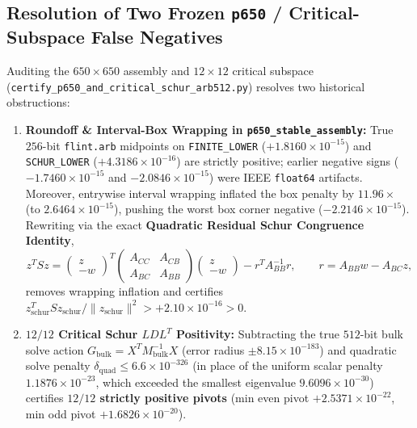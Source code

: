\documentclass[11pt,a4paper]{article}
\theoremstyle{definition}
\begin{document}
\subsection{Resolution of Two Frozen \texttt{p650} / Critical-Subspace False Negatives}
Auditing the $650 \times 650$ assembly and $12 \times 12$ critical subspace (\texttt{certify\_\allowbreak p650\_\allowbreak and\_\allowbreak critical\_\allowbreak schur\_\allowbreak arb512.py}) resolves two historical obstructions:
\begin{enumerate}[label=(\arabic*),noitemsep]
  \item \textbf{Roundoff \& Interval-Box Wrapping in \texttt{p650\_\allowbreak stable\_\allowbreak assembly}:} True $256$-bit \texttt{flint.arb} midpoints on \texttt{FINITE\_LOWER} ($+1.8160 \times 10^{-15}$) and \texttt{SCHUR\_LOWER} ($+4.3186 \times 10^{-16}$) are strictly positive; earlier negative signs ($-1.7460 \times 10^{-15}$ and $-2.0846 \times 10^{-15}$) were IEEE \texttt{float64} artifacts. Moreover, entrywise interval wrapping inflated the box penalty by $11.96\times$ (to $2.6464 \times 10^{-15}$), pushing the worst box corner negative ($-2.2146 \times 10^{-15}$). Rewriting via the exact \textbf{Quadratic Residual Schur Congruence Identity},
  \begin{equation}
  z^T S z = \begin{pmatrix} z \\ -w \end{pmatrix}^T \begin{pmatrix} A_{CC} & A_{CB} \\ A_{BC} & A_{BB} \end{pmatrix} \begin{pmatrix} z \\ -w \end{pmatrix} - r^T A_{BB}^{-1} r, \qquad r = A_{BB}w - A_{BC}z,
  \end{equation}
  removes wrapping inflation and certifies $z_{\mathrm{schur}}^T S z_{\mathrm{schur}}/\|z_{\mathrm{schur}}\|^2 > +2.10 \times 10^{-16} > 0$.
  \item \textbf{$12/12$ Critical Schur $LDL^T$ Positivity:} Subtracting the true $512$-bit bulk solve action $G_{\mathrm{bulk}} = X^T M_{\mathrm{bulk}}^{-1} X$ (error radius $\pm 8.15 \times 10^{-183}$) and quadratic solve penalty $\delta_{\mathrm{quad}} \le 6.6 \times 10^{-326}$ (in place of the uniform scalar penalty $1.1876 \times 10^{-23}$, which exceeded the smallest eigenvalue $9.6096 \times 10^{-30}$) certifies \textbf{$12/12$ strictly positive pivots} (min even pivot $+2.5371 \times 10^{-22}$, min odd pivot $+1.6826 \times 10^{-20}$).
\end{enumerate}
\end{document}

